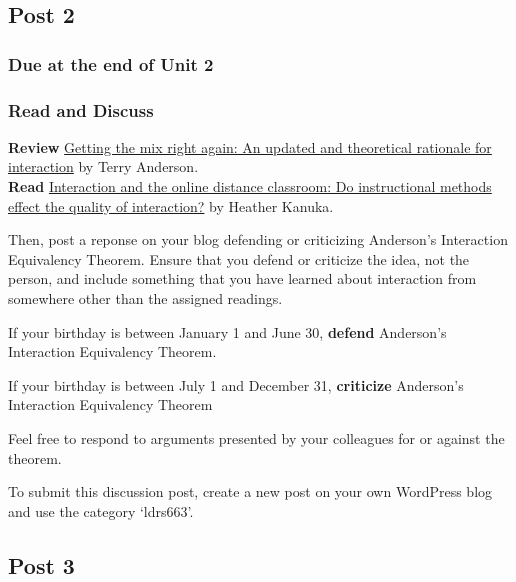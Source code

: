 \documentclass[
]{book}
\begin{document}
\hypertarget{post-2}{%
\subsection*{Post 2}\label{post-2}}

\hypertarget{due-at-the-end-of-unit-2}{%
\subsubsection*{Due at the end of Unit 2}\label{due-at-the-end-of-unit-2}}

\hypertarget{read-and-discuss}{%
\subsubsection*{Read and Discuss}\label{read-and-discuss}}

\textbf{Review} \href{https://www.irrodl.org/index.php/irrodl/article/view/149/230}{Getting the mix right again: An updated and theoretical rationale for interaction} by Terry Anderson.\\
\textbf{Read} \href{https://link-springer-com.ezproxy.student.twu.ca/article/10.1007/s12528-011-9049-4}{Interaction and the online distance classroom: Do instructional methods effect the quality of interaction?} by Heather Kanuka.

Then, post a reponse on your blog defending or criticizing Anderson's Interaction Equivalency Theorem. Ensure that you defend or criticize the idea, not the person, and include something that you have learned about interaction from somewhere other than the assigned readings.

If your birthday is between January 1 and June 30, \textbf{defend} Anderson's Interaction Equivalency Theorem.

If your birthday is between July 1 and December 31, \textbf{criticize} Anderson's Interaction Equivalency Theorem

Feel free to respond to arguments presented by your colleagues for or against the theorem.

To submit this discussion post, create a new post on your own WordPress blog and use the category `ldrs663'.

\hypertarget{post-3}{%
\subsection*{Post 3}\label{post-3}}
\end{document}
